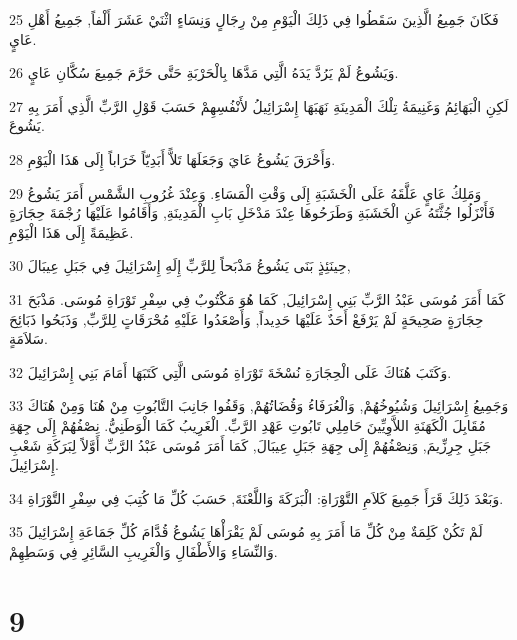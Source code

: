 \par 25 فَكَانَ جَمِيعُ الَّذِينَ سَقَطُوا فِي ذَلِكَ الْيَوْمِ مِنْ رِجَالٍ وَنِسَاءٍ اثْنَيْ عَشَرَ أَلْفاً, جَمِيعُ أَهْلِ عَايٍ.
\par 26 وَيَشُوعُ لَمْ يَرُدَّ يَدَهُ الَّتِي مَدَّهَا بِالْحَرْبَةِ حَتَّى حَرَّمَ جَمِيعَ سُكَّانِ عَايٍ.
\par 27 لَكِنِ الْبَهَائِمُ وَغَنِيمَةُ تِلْكَ الْمَدِينَةِ نَهَبَهَا إِسْرَائِيلُ لأَنْفُسِهِمْ حَسَبَ قَوْلِ الرَّبِّ الَّذِي أَمَرَ بِهِ يَشُوعَ.
\par 28 وَأَحْرَقَ يَشُوعُ عَايَ وَجَعَلَهَا تَلاًّ أَبَدِيّاً خَرَاباً إِلَى هَذَا الْيَوْمِ.
\par 29 وَمَلِكُ عَايٍ عَلَّقَهُ عَلَى الْخَشَبَةِ إِلَى وَقْتِ الْمَسَاءِ. وَعِنْدَ غُرُوبِ الشَّمْسِ أَمَرَ يَشُوعُ فَأَنْزَلُوا جُثَّتَهُ عَنِ الْخَشَبَةِ وَطَرَحُوهَا عِنْدَ مَدْخَلِ بَابِ الْمَدِينَةِ, وَأَقَامُوا عَلَيْهَا رُجْمَةَ حِجَارَةٍ عَظِيمَةً إِلَى هَذَا الْيَوْمِ.
\par 30 حِينَئِذٍ بَنَى يَشُوعُ مَذْبَحاً لِلرَّبِّ إِلَهِ إِسْرَائِيلَ فِي جَبَلِ عِيبَالَ,
\par 31 كَمَا أَمَرَ مُوسَى عَبْدُ الرَّبِّ بَنِي إِسْرَائِيلَ, كَمَا هُوَ مَكْتُوبٌ فِي سِفْرِ تَوْرَاةِ مُوسَى. مَذْبَحَ حِجَارَةٍ صَحِيحَةٍ لَمْ يَرْفَعْ أَحَدٌ عَلَيْهَا حَدِيداً, وَأَصْعَدُوا عَلَيْهِ مُحْرَقَاتٍ لِلرَّبِّ, وَذَبَحُوا ذَبَائِحَ سَلاَمَةٍ.
\par 32 وَكَتَبَ هُنَاكَ عَلَى الْحِجَارَةِ نُسْخَةَ تَوْرَاةِ مُوسَى الَّتِي كَتَبَهَا أَمَامَ بَنِي إِسْرَائِيلَ.
\par 33 وَجَمِيعُ إِسْرَائِيلَ وَشُيُوخُهُمْ, وَالْعُرَفَاءُ وَقُضَاتُهُمْ, وَقَفُوا جَانِبَ التَّابُوتِ مِنْ هُنَا وَمِنْ هُنَاكَ مُقَابِلَ الْكَهَنَةِ اللاَّوِيِّينَ حَامِلِي تَابُوتِ عَهْدِ الرَّبِّ. الْغَرِيبُ كَمَا الْوَطَنِيُّ. نِصْفُهُمْ إِلَى جِهَةِ جَبَلِ جِرِزِّيمَ, وَنِصْفُهُمْ إِلَى جِهَةِ جَبَلِ عِيبَالَ, كَمَا أَمَرَ مُوسَى عَبْدُ الرَّبِّ أَوَّلاً لِبَرَكَةِ شَعْبِ إِسْرَائِيلَ.
\par 34 وَبَعْدَ ذَلِكَ قَرَأَ جَمِيعَ كَلاَمِ التَّوْرَاةِ: الْبَرَكَةَ وَاللَّعْنَةَ, حَسَبَ كُلِّ مَا كُتِبَ فِي سِفْرِ التَّوْرَاةِ.
\par 35 لَمْ تَكُنْ كَلِمَةٌ مِنْ كُلِّ مَا أَمَرَ بِهِ مُوسَى لَمْ يَقْرَأْهَا يَشُوعُ قُدَّامَ كُلِّ جَمَاعَةِ إِسْرَائِيلَ وَالنِّسَاءِ وَالأَطْفَالِ وَالْغَرِيبِ السَّائِرِ فِي وَسَطِهِمْ.

\chapter{9}

